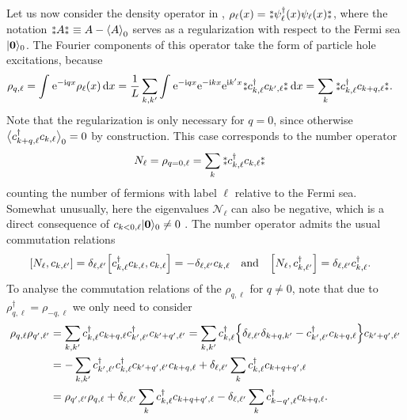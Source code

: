 Let us now consider the density operator in \trspace{},
$\rho_\ell(x) = \varnormord{\psi_\ell^\dagger(x) \psi_\ell(x)}$, where the notation $\varnormord{A} \equiv A - \bra*{A}_0$ serves as a regularization with respect to the Fermi sea $\Ket{\textbf{0}}_0$.
The Fourier components of this operator take the form of particle hole excitations, because
\begin{align*}
\rho_{q,\ell} &= \intx{ }{ }{\powe{-\i qx}\rho_\ell(x)}{x} = \frac{1}{L} \sum_{k,k'} \intx{ }{ }{ \powe{-\i qx} \powe{-\i kx} \powe{\i k'x} \varnormord{c_{k,\ell}^\dagger c_{k',\ell}}}{x} = \sum_k \varnormord{c_{k,\ell}^\dagger c_{k+q,\ell}}.
\end{align*}
Note that the regularization is only necessary for $q=0$, since otherwise $\bra[\big]{c_{k+q,\ell}^\dagger c_{k,\ell}}_0 = 0$ by construction. 
This case corresponds to the number operator
\begin{align*}
N_\ell &= \rho_{q=0,\ell} = \sum_k \varnormord{c_{k,\ell}^\dagger c_{k,\ell}}
\end{align*}
counting the number of fermions with label $\ell$ relative to the Fermi sea.
Somewhat unusually, here the eigenvalues $\mathcal{N}_\ell$ can also be negative, which is a direct consequence of $c_{k<0,\ell} \Ket{\textbf{0}}_0 \neq 0$ \cite{Bosonization_DelftSchoeller_1998}.
The number operator admits the usual commutation relations
\begin{align*}
\klb*{N_\ell, c_{k,\ell'}} &= \delta_{\ell,\ell'} \klb*{c_{k,\ell}^\dagger c_{k,\ell}, c_{k,\ell}} = -\delta_{\ell,\ell'} c_{k,\ell}\quad \text{and} \quad \klb*{N_\ell, c_{k,\ell'}^\dagger} = \delta_{\ell,\ell'} c_{k,\ell}^\dagger.
\end{align*}
\vspace*{-1em}
To analyse the commutation relations of the $\rho_{q,\ell}$ for $q\neq 0$, note that due to $\rho_{q,\ell}^\dagger = \rho_{-q,\ell}$ we only need to consider
\begin{align*}
\rho_{q,\ell} \rho_{q',\ell'} &= \sum_{k,k'}c_{k,\ell}^\dagger c_{k+q,\ell} c_{k',\ell'}^\dagger c_{k'+q',\ell'} = \sum_{k,k'}c_{k,\ell}^\dagger \klc*{\delta_{\ell,\ell'} \delta_{k+q,k'} - c_{k',\ell'}^\dagger c_{k+q,\ell} } c_{k'+q',\ell'}\\
&= -\sum_{k,k'} c_{k',\ell'}^\dagger c_{k,\ell}^\dagger c_{k'+q',\ell'} c_{k+q,\ell} + \delta_{\ell,\ell'} \sum_k c_{k,\ell}^\dagger c_{k+q+q',\ell}\\
&= \rho_{q',\ell'}\rho_{q,\ell} + \delta_{\ell,\ell'} \sum_k c_{k,\ell}^\dagger c_{k+q+q',\ell} - \delta_{\ell,\ell'} \sum_k c_{k-q',\ell}^\dagger c_{k+q,\ell}.
\end{align*}
